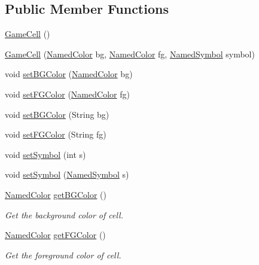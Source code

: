 \subsection*{Public Member Functions}
\begin{DoxyCompactItemize}
\item 
\hyperlink{classbridges_1_1base_1_1_game_cell_a59a4bedeb15c55b71998635520eae21e}{Game\+Cell} ()
\item 
\hyperlink{classbridges_1_1base_1_1_game_cell_aa8c18bc86d5595a6372dbdda66add0fd}{Game\+Cell} (\hyperlink{enumbridges_1_1base_1_1_named_color}{Named\+Color} bg, \hyperlink{enumbridges_1_1base_1_1_named_color}{Named\+Color} fg, \hyperlink{enumbridges_1_1base_1_1_named_symbol}{Named\+Symbol} symbol)
\item 
void \hyperlink{classbridges_1_1base_1_1_game_cell_aa29ae1568daddbc1ca5eec2155385f10}{set\+B\+G\+Color} (\hyperlink{enumbridges_1_1base_1_1_named_color}{Named\+Color} bg)
\item 
void \hyperlink{classbridges_1_1base_1_1_game_cell_af01906e011187218bddf63ddce8c42eb}{set\+F\+G\+Color} (\hyperlink{enumbridges_1_1base_1_1_named_color}{Named\+Color} fg)
\item 
void \hyperlink{classbridges_1_1base_1_1_game_cell_a60805632dec196bfbae6a4de40171447}{set\+B\+G\+Color} (String bg)
\item 
void \hyperlink{classbridges_1_1base_1_1_game_cell_a3ffaf3300d8196a92d46e7c88ae32a86}{set\+F\+G\+Color} (String fg)
\item 
void \hyperlink{classbridges_1_1base_1_1_game_cell_a5e6b4ed374ed3ec4bd6e72723e94848e}{set\+Symbol} (int s)
\item 
void \hyperlink{classbridges_1_1base_1_1_game_cell_a246ba3b4a56f2e440ac21fb0ba297e06}{set\+Symbol} (\hyperlink{enumbridges_1_1base_1_1_named_symbol}{Named\+Symbol} s)
\item 
\hyperlink{enumbridges_1_1base_1_1_named_color}{Named\+Color} \hyperlink{classbridges_1_1base_1_1_game_cell_a7e910723cc5a678ef75f24f993b0c2ca}{get\+B\+G\+Color} ()
\begin{DoxyCompactList}\small\item\em Get the background color of cell. \end{DoxyCompactList}\item 
\hyperlink{enumbridges_1_1base_1_1_named_color}{Named\+Color} \hyperlink{classbridges_1_1base_1_1_game_cell_a9355404eb09017ca7ee3e90490e1d13b}{get\+F\+G\+Color} ()
\begin{DoxyCompactList}\small\item\em Get the foreground color of cell. \end{DoxyCompactList}\item 

\end{DoxyCompactItemize}
